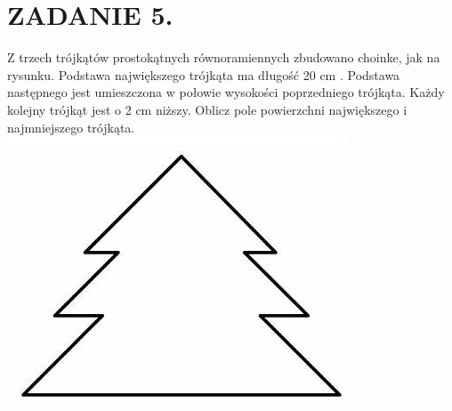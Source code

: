 \documentclass[10pt]{article}
\begin{document}
\section*{ZADANIE 5.}
Z trzech trójkątów prostokątnych równoramiennych zbudowano choinke, jak na rysunku. Podstawa największego trójkąta ma długość 20 cm . Podstawa następnego jest umieszczona w połowie wysokości poprzedniego trójkąta. Każdy kolejny trójkąt jest o 2 cm niższy. Oblicz pole powierzchni największego i najmniejszego trójkąta.\\
\includegraphics[max width=\textwidth, center]{2024_11_21_428684ae64167c130f83g-1}
\end{document}
